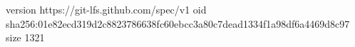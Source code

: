 version https://git-lfs.github.com/spec/v1
oid sha256:01e82ecd319d2c8823786638fc60ebcc3a80c7dead1334f1a98df6a4469d8c97
size 1321
